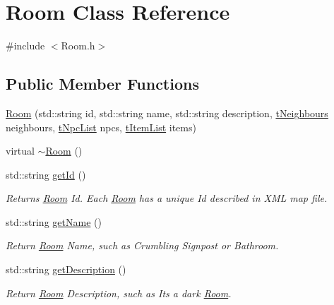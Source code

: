 \hypertarget{class_room}{}\section{Room Class Reference}
\label{class_room}


{\ttfamily \#include $<$Room.\+h$>$}

\subsection*{Public Member Functions}
\begin{DoxyCompactItemize}
\item 
\mbox{\hyperlink{class_room_a08ec9bd6f436a8a99c499e930da7359c}{Room}} (std\+::string id, std\+::string name, std\+::string description, \mbox{\hyperlink{_room_8h_a55f50192b1292aaa3b0967ecd0b1fddd}{t\+Neighbours}} neighbours, \mbox{\hyperlink{_room_8h_af9e617d8fa018c922a1e9748f7e046f9}{t\+Npc\+List}} npcs, \mbox{\hyperlink{_room_8h_a2b991bc4061fac67565cc6be66a568ac}{t\+Item\+List}} items)
\item 
virtual \mbox{\hyperlink{class_room_a67d5da09983cc53097807fd43ba5481a}{$\sim$\+Room}} ()
\item 
std\+::string \mbox{\hyperlink{class_room_a188ae0c43f994ea4a5a1f86a308623a7}{get\+Id}} ()
\begin{DoxyCompactList}\small\item\em Returns \mbox{\hyperlink{class_room}{Room}} Id. Each \mbox{\hyperlink{class_room}{Room}} has a unique Id described in X\+ML map file. \end{DoxyCompactList}\item 
std\+::string \mbox{\hyperlink{class_room_a5701522ecf180c978eaa454d79f3e305}{get\+Name}} ()
\begin{DoxyCompactList}\small\item\em Return \mbox{\hyperlink{class_room}{Room}} Name, such as Crumbling Signpost or Bathroom. \end{DoxyCompactList}\item 
std\+::string \mbox{\hyperlink{class_room_a81fc1cb26425dfd00f45e7cb12fa5d88}{get\+Description}} ()
\begin{DoxyCompactList}\small\item\em Return \mbox{\hyperlink{class_room}{Room}} Description, such as \textquotesingle{}It\textquotesingle{}s a dark \mbox{\hyperlink{class_room}{Room}}\textquotesingle{}. \end{DoxyCompactList}\item 

\end{DoxyCompactItemize}
